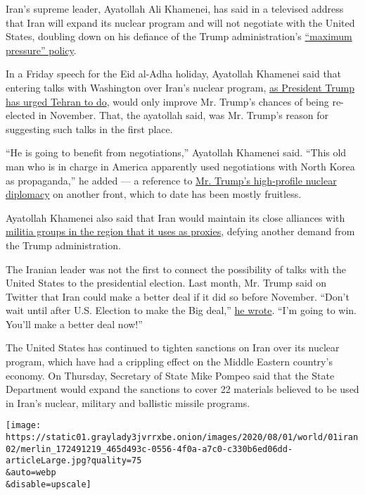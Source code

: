 Iran's supreme leader, Ayatollah Ali Khamenei, has said in a televised
address that Iran will expand its nuclear program and will not negotiate
with the United States, doubling down on his defiance of the Trump
administration's
\href{https://www.nytimes3xbfgragh.onion/2019/06/14/us/politics/us-iran.html}{``maximum
pressure'' policy}.

In a Friday speech for the Eid al-Adha holiday, Ayatollah Khamenei said
that entering talks with Washington over Iran's nuclear program,
\href{https://www.nytimes3xbfgragh.onion/2020/06/05/world/middleeast/trump-iran-nuclear.html}{as
President Trump has urged Tehran to do}, would only improve Mr. Trump's
chances of being re-elected in November. That, the ayatollah said, was
Mr. Trump's reason for suggesting such talks in the first place.

``He is going to benefit from negotiations,'' Ayatollah Khamenei said.
``This old man who is in charge in America apparently used negotiations
with North Korea as propaganda,'' he added --- a reference to
\href{https://www.nytimes3xbfgragh.onion/2020/04/19/world/asia/north-korea-denies-nice-note-trump.html}{Mr.
Trump's high-profile nuclear diplomacy} on another front, which to date
has been mostly fruitless.

Ayatollah Khamenei also said that Iran would maintain its close
alliances with
\href{https://www.nytimes3xbfgragh.onion/2016/11/20/world/middleeast/iran-saudi-proxy-war.html}{militia
groups in the region that it uses as proxies}, defying another demand
from the Trump administration.

The Iranian leader was not the first to connect the possibility of talks
with the United States to the presidential election. Last month, Mr.
Trump said on Twitter that Iran could make a better deal if it did so
before November. ``Don't wait until after U.S. Election to make the Big
deal,''
\href{https://twitter.com/realDonaldTrump/status/1268774841810911232}{he
wrote}. ``I'm going to win. You'll make a better deal now!''

The United States has continued to tighten sanctions on Iran over its
nuclear program, which have had a crippling effect on the Middle Eastern
country's economy. On Thursday, Secretary of State Mike Pompeo said that
the State Department would expand the sanctions to cover 22 materials
believed to be used in Iran's nuclear, military and ballistic missile
programs.

\texttt{[image: https://static01.graylady3jvrrxbe.onion/images/2020/08/01/world/01iran02/merlin\_172491219\_465d493c-0556-4f0a-a7c0-c330b6ed06dd-articleLarge.jpg?quality=75\\\&auto=webp\\\&disable=upscale]}

